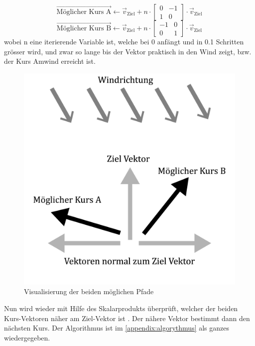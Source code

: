 $$\vec{\text{Möglicher Kurs A}} \gets \vec{v}_{\text{Ziel}} + n \cdot \begin{bmatrix}0 & -1 \\ 1 & 0\end{bmatrix} \cdot \vec{v}_{\text{Ziel}}$$
$$\vec{\text{Möglicher Kurs B}} \gets \vec{v}_{\text{Ziel}} + n \cdot \begin{bmatrix}-1 & 0 \\ 0 & 1\end{bmatrix} \cdot \vec{v}_{\text{Ziel}}$$
wobei n eine iterierende Variable ist, welche bei 0 anfängt und in 0.1 Schritten grösser wird, und zwar so lange bis der Vektor praktisch in den Wind zeigt, bzw. der Kurs Amwind erreicht ist. \\
\begin{figure}[H]
    \centering
    \includegraphics[width=0.5\linewidth]{algorythmus Vektoren.png}
    \caption{Visualisierung der beiden möglichen Pfade}
    \label{fig:enter-label}
\end{figure}
Nun wird wieder mit Hilfe des Skalarprodukts überprüft, welcher der beiden Kurs-Vektoren näher am Ziel-Vektor ist . Der nähere Vektor bestimmt dann den nächsten Kurs. Der Algorithmus ist im \cref{appendix:algorythmus} als ganzes wiedergegeben.
